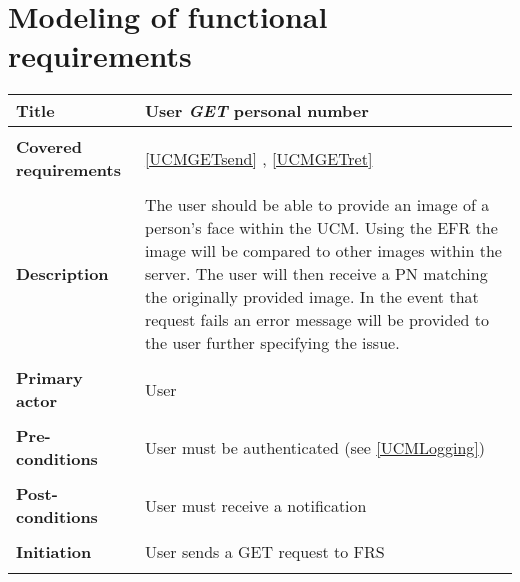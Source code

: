 \documentclass[a4paper,11pt]{article}
\begin{document}
\newpage
\section{Modeling of functional requirements}


\begin{tabular}{|p{3.5cm}|p{11.5cm}|} \hline
    \textbf{Title} &   User \emph{GET} personal number 
        
    \\ \hline \rowcolor{Gray} & \\ \hline
        
            \textbf{Covered requirements} &  \ref{UCMGETsend} , \ref{UCMGETret}
        
    \\ \hline \rowcolor{Gray} & \\ \hline
        
        
    \textbf{Description} &  The user should be able to provide an image of a person's face within the UCM. Using the EFR the image will be compared to other images within the server. The user will then receive a PN matching the originally provided image. In the event that request fails an error message will be provided to the user further specifying the issue.
        
    \\ \hline \rowcolor{Gray} & \\ \hline
        
    \textbf{Primary actor} & User  
        
    \\ \hline \rowcolor{Gray} & \\ \hline 
          
    \textbf{Pre-conditions} &   User must be authenticated (see \ref{UCMLogging})
        
    \\ \hline \rowcolor{Gray} & \\ \hline
         
    \textbf{Post-conditions} &   User must receive a notification
        
    \\ \hline \rowcolor{Gray} & \\ \hline 
         
    \textbf{Initiation} & User sends a GET request to FRS
        
    \\ \hline \rowcolor{Gray} & \\ \hline 
         

\end{tabular}
\end{document}
